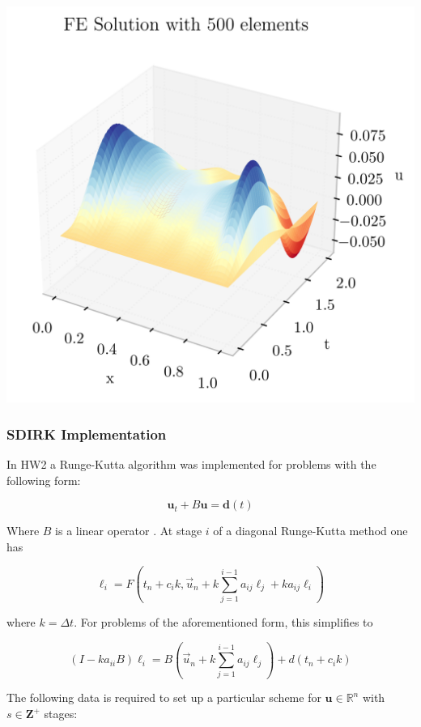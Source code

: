 \documentclass[
  11pt,
]{article}
\let\origfigure\figure
\let\endorigfigure\endfigure
\renewenvironment{figure}[1][2] {
    \expandafter\origfigure\expandafter[H]
} {
    \endorigfigure
}
\begin{document}
\begin{figure}
\centering
\includegraphics{../img/p3b-fem-iso.png}
\caption{FEM solution}
\end{figure}

\hypertarget{sdirk-implementation}{%
\subsubsection{SDIRK Implementation}\label{sdirk-implementation}}

In HW2 a Runge-Kutta algorithm was implemented for problems with the
following form:

\[
\mathbf{u}_t + B\mathbf{u} = \mathbf{d}(t)
\]

Where \(B\) is a linear operator . At stage \(i\) of a diagonal
Runge-Kutta method one has

\[
\ell_{i}=F\left(t_{n}+c_{i} k, \vec{u}_{n}+k \sum_{j=1}^{i-1} a_{i j} \ell_{j}+k a_{i j} \ell_{i}\right)
\]

where \(k=\Delta t\). For problems of the aforementioned form, this
simplifies to

\[
\left(I - k a_{i i} B\right) \ell_{i} = B \left(\vec{u}_{n}+k \sum_{j=1}^{i-1} a_{i j} \ell_{j}\right) + d(t_n+c_i k) 
\]

The following data is required to set up a particular scheme for
\(\mathbf{u}\in \mathbb{R}^n\) with \(s\in\mathbf{Z^+}\) stages:
\end{document}

